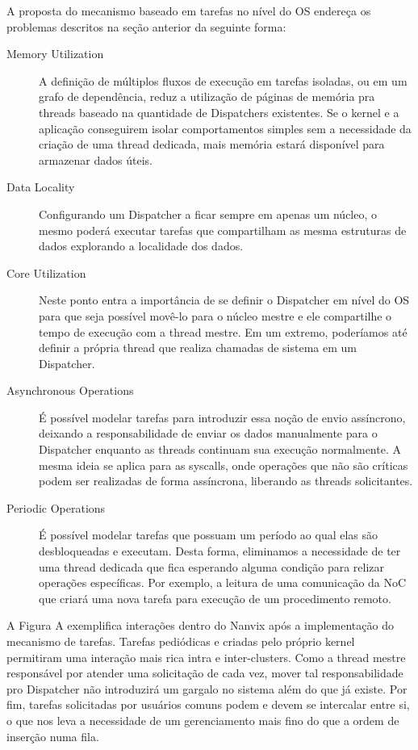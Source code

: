 	A proposta do mecanismo baseado em tarefas no nível do OS endereça os
	problemas descritos na seção anterior da seguinte forma:
	\begin{description}

		\item[Memory Utilization] A definição de múltiplos fluxos de execução
			em tarefas isoladas, ou em um grafo de dependência, reduz
			a utilização de páginas de memória pra threads baseado na
			quantidade de Dispatchers existentes. Se o kernel e a aplicação
			conseguirem isolar comportamentos simples sem a necessidade da
			criação de uma thread dedicada, mais memória estará disponível para
			armazenar dados úteis.

		\item[Data Locality] Configurando um Dispatcher a ficar sempre em
			apenas um núcleo, o mesmo poderá executar tarefas que compartilham
			as mesma estruturas de dados explorando a localidade dos dados.

		\item[Core Utilization] Neste ponto entra a importância de se definir
			o Dispatcher em nível do OS para que seja possível movê-lo para
			o núcleo mestre e ele compartilhe o tempo de execução com a thread
			mestre.  Em um extremo, poderíamos até definir a própria thread que
			realiza chamadas de sistema em um Dispatcher.

		\item[Asynchronous Operations] É possível modelar tarefas para
			introduzir essa noção de envio assíncrono, deixando
			a responsabilidade de enviar os dados manualmente para o Dispatcher
			enquanto as threads continuam sua execução normalmente.  A mesma
			ideia se aplica para as syscalls, onde operações que não são
			críticas podem ser realizadas de forma assíncrona, liberando as
			threads solicitantes.

		\item[Periodic Operations] É possível modelar tarefas que possuam um
			período ao qual elas são desbloqueadas e executam. Desta forma,
			eliminamos a necessidade de ter uma thread dedicada que fica
			esperando alguma condição para relizar operações específicas.  Por
			exemplo, a leitura de uma comunicação da NoC que criará uma nova
			tarefa para execução de um procedimento remoto.

	\end{description}

	A Figura A exemplifica interações dentro do Nanvix após a implementação
	do mecanismo de tarefas. Tarefas pediódicas e criadas pelo próprio kernel
	permitiram uma interação mais rica intra e inter-clusters. Como a thread
	mestre responsável por atender uma solicitação de cada vez, mover tal
	responsabilidade pro Dispatcher não introduzirá um gargalo no sistema além
	do que já existe. Por fim, tarefas solicitadas por usuários comuns podem
	e devem se intercalar entre si, o que nos leva a necessidade de um
	gerenciamento mais fino do que a ordem de inserção numa fila.

